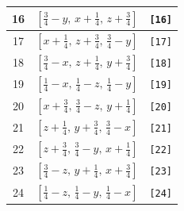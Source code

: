 \documentclass[fleqn,8pt]{jsarticle}
\begin{document}
\begin{longtable}{ccc}
16 & $\left[ \frac{3}{4} - y,\, x + \frac{1}{4},\, z + \frac{3}{4} \right]$ & {\tt [16]} \\ \hline
17 & $\left[ x + \frac{1}{4},\, z + \frac{3}{4},\, \frac{3}{4} - y \right]$ & {\tt [17]} \\ \hline
18 & $\left[ \frac{3}{4} - x,\, z + \frac{1}{4},\, y + \frac{3}{4} \right]$ & {\tt [18]} \\ \hline
19 & $\left[ \frac{1}{4} - x,\, \frac{1}{4} - z,\, \frac{1}{4} - y \right]$ & {\tt [19]} \\ \hline
20 & $\left[ x + \frac{3}{4},\, \frac{3}{4} - z,\, y + \frac{1}{4} \right]$ & {\tt [20]} \\ \hline
21 & $\left[ z + \frac{1}{4},\, y + \frac{3}{4},\, \frac{3}{4} - x \right]$ & {\tt [21]} \\ \hline
22 & $\left[ z + \frac{3}{4},\, \frac{3}{4} - y,\, x + \frac{1}{4} \right]$ & {\tt [22]} \\ \hline
23 & $\left[ \frac{3}{4} - z,\, y + \frac{1}{4},\, x + \frac{3}{4} \right]$ & {\tt [23]} \\ \hline
24 & $\left[ \frac{1}{4} - z,\, \frac{1}{4} - y,\, \frac{1}{4} - x \right]$ & {\tt [24]} \\
\end{longtable}
\end{document}
